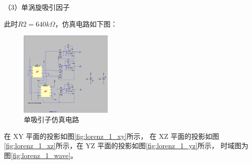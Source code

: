 \documentclass[10pt,a4paper,twoside,UTF8]{ctexart}
\begin{document}
（3）单涡旋吸引因子

此时$R2=640k\Omega$，仿真电路如下图：

\begin{figure}[H]
	\centering
	\includegraphics[width=0.4\textwidth]{fig/lo_1_cir.png}
	\caption{单吸引子仿真电路}
\end{figure}

在 XY 平面的投影如图\ref{fig:lorenz_1_xy}所示，
在 XZ 平面的投影如图\ref{fig:lorenz_1_xz}所示，在 YZ 平面的投影如图\ref{fig:lorenz_1_yz}所示，
时域图为图\ref{fig:lorenz_1_wave}。
\end{document}
